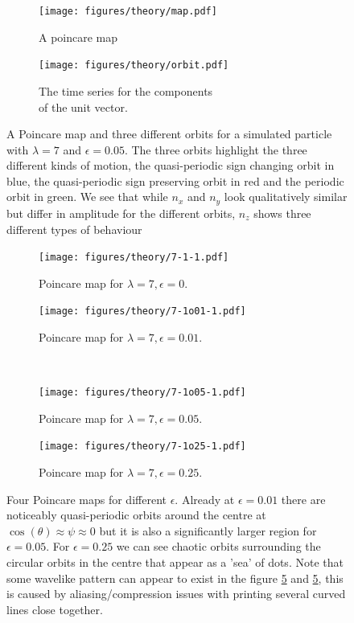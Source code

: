 \begin{figure}[H]
\centering
\begin{subfigure}[b]{0.45\textwidth}
\texttt{[image: figures/theory/map.pdf]}
\caption{A poincare map}\label{fig:orbitmap}
\end{subfigure}\hspace{1em}%
\begin{subfigure}[b]{0.5\textwidth}
\texttt{[image: figures/theory/orbit.pdf]}
\caption{The time series for the components \\ of the unit vector.}\label{fig:orbitparams}
\end{subfigure}
\caption{A Poincare map and three different orbits for a simulated particle with $\lambda=7$ and $\epsilon=0.05$. The three orbits highlight the three different kinds of motion, the quasi-periodic sign changing orbit in blue, the quasi-periodic sign preserving orbit in red and the periodic orbit in green. We see that while $n_x$ and $n_y$ look qualitatively similar but differ in amplitude for the different orbits, $n_z$ shows three different types of behaviour}
\label{fig:orbittypes}
\end{figure}



\begin{figure}[H]
\centering
\begin{subfigure}[3a]{0.40\textwidth}
\texttt{[image: figures/theory/7-1-1.pdf]}
\caption{Poincare map for $\lambda = 7, \epsilon = 0$.}\label{fig:orbitmap1}
\end{subfigure}\hspace{1em}%
\begin{subfigure}[3b]{0.40\textwidth}
\texttt{[image: figures/theory/7-1o01-1.pdf]}
\caption{Poincare map for $\lambda = 7, \epsilon = 0.01$.}\label{fig:orbitmap2}
\end{subfigure} \\
\begin{subfigure}[3a]{0.40\textwidth}
\texttt{[image: figures/theory/7-1o05-1.pdf]}
\caption{Poincare map for $\lambda = 7, \epsilon = 0.05$.}\label{fig:orbitmap3}
\end{subfigure}\hspace{1em}%
	\begin{subfigure}[3b]{0.40\textwidth}
\texttt{[image: figures/theory/7-1o25-1.pdf]}
\caption{Poincare map for $\lambda = 7, \epsilon = 0.25$.}\label{fig:orbitmap4}
\end{subfigure} 
\caption{Four Poincare maps for different $\epsilon$. Already at $\epsilon = 0.01$ there are noticeably quasi-periodic 
orbits around the centre at $\cos(\theta) \approx \psi \approx 0$ but it is also a significantly larger region for $\epsilon = 0.05$. For $\epsilon = 0.25$ we can see chaotic orbits surrounding the circular orbits in the centre that appear as a 'sea' of dots. Note that some wavelike pattern can appear to exist in the figure \ref{fig:orbitmap2} and  \ref{fig:orbitmap2}, this is caused by aliasing/compression issues with printing several curved lines close together.}\label{fig:orbitmaps}
\end{figure}

